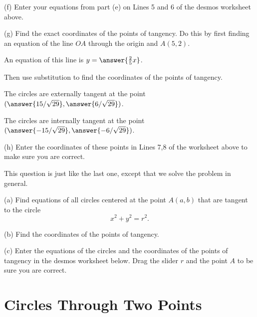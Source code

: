 \documentclass{ximera}
\begin{document}
\begin{question}
(f) Enter your equations from part (e) on Lines 5 and 6 of the desmos worksheet above.  

(g) Find the exact coordinates of the points of tangency. Do this by first finding an equation of the line $OA$ through the origin and $A(5,2)$. 

An equation of this line is $y=\answer{\frac{2}{5}x}$.

Then use substitution to find the coordinates of the points of tangency.

The circles are externally tangent at the point $(\answer{15/\sqrt{29}}, \answer{6/\sqrt{29}})$.

 The circles are internally tangent at the point $(\answer{-15/\sqrt{29}}, \answer{-6/\sqrt{29}})$.

(h) Enter the coordinates of these points in Lines 7,8 of the worksheet above to make sure you are correct.

\end{question}


\begin{question}  \label{Q:3423425523}
This question is just like the last one, except that we solve the problem in general.

(a) Find equations of all circles centered at the point $A(a,b)$ that are tangent to the circle
\[
      x^2 + y^2 = r^2.
\]

(b) Find the coordinates of the points of tangency.

(c) Enter the equations of the circles and the coordinates of the points of tangency in the desmos worksheet below. Drag the slider $r$ and the point $A$ to be sure you are correct.

\begin{onlineOnly}
    \begin{center}
\end{center}
\end{onlineOnly}

\end{question}


\section*{Circles Through Two Points}
\end{document}
